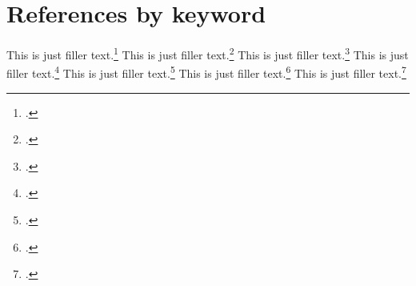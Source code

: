 \documentclass[a4paper,oneside]{book}
\begin{document}
\chapter{References by keyword}

This is just filler text.\footcite{aristotle:anima}
This is just filler text.\footcite{nussbaum}
This is just filler text.\footcite{averroes/bland}
This is just filler text.\footcite{hyman}
This is just filler text.\footcite{aristotle:physics}
This is just filler text.\footcite{moraux}
This is just filler text.\footcite{pines}

\printbibheading
\printbibliography[keyword=primary,heading=subbibliography,title={Primary Sources}]
\printbibliography[keyword=secondary,heading=subbibliography,title={Secondary Sources}]
\end{document}
